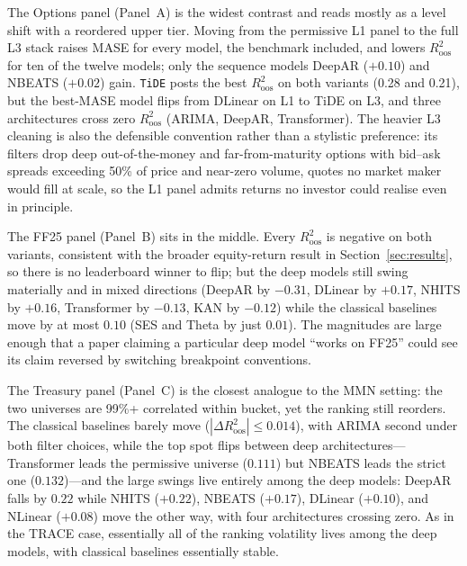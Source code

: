 \documentclass{article}
\begin{document}
The Options panel (Panel~A) is the widest contrast and reads mostly as a level shift with a reordered upper tier. Moving from the permissive L1 panel to the full L3 stack raises MASE for every model, the benchmark included, and lowers $R^2_{\text{oos}}$ for ten of the twelve models; only the sequence models DeepAR ($+0.10$) and NBEATS ($+0.02$) gain. \texttt{TiDE} posts the best $R^2_{\text{oos}}$ on both variants (0.28 and 0.21), but the best-MASE model flips from DLinear on L1 to TiDE on L3, and three architectures cross zero $R^2_{\text{oos}}$ (ARIMA, DeepAR, Transformer). The heavier L3 cleaning is also the defensible convention rather than a stylistic preference: its filters drop deep out-of-the-money and far-from-maturity options with bid--ask spreads exceeding 50\% of price and near-zero volume, quotes no market maker would fill at scale, so the L1 panel admits returns no investor could realise even in principle.

The FF25 panel (Panel~B) sits in the middle. Every $R^2_{\text{oos}}$ is negative on both variants, consistent with the broader equity-return result in Section~\ref{sec:results}, so there is no leaderboard winner to flip; but the deep models still swing materially and in mixed directions (DeepAR by $-0.31$, DLinear by $+0.17$, NHITS by $+0.16$, Transformer by $-0.13$, KAN by $-0.12$) while the classical baselines move by at most $0.10$ (SES and Theta by just $0.01$). The magnitudes are large enough that a paper claiming a particular deep model ``works on FF25'' could see its claim reversed by switching breakpoint conventions.

The Treasury panel (Panel~C) is the closest analogue to the MMN setting: the two universes are 99\%+ correlated within bucket, yet the ranking still reorders. The classical baselines barely move ($|\Delta R^2_{\text{oos}}| \leq 0.014$), with ARIMA second under both filter choices, while the top spot flips between deep architectures---Transformer leads the permissive universe ($0.111$) but NBEATS leads the strict one ($0.132$)---and the large swings live entirely among the deep models: DeepAR falls by $0.22$ while NHITS ($+0.22$), NBEATS ($+0.17$), DLinear ($+0.10$), and NLinear ($+0.08$) move the other way, with four architectures crossing zero. As in the TRACE case, essentially all of the ranking volatility lives among the deep models, with classical baselines essentially stable.
\end{document}
